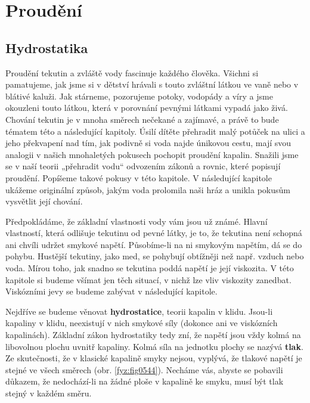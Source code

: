 \setchaptertoc
\chapter{Proudění }\label{fyz:IIchapXL}

  \section{Hydrostatika}\label{fyz:IIchapXLsecI}
    Proudění tekutin a zvláště vody fascinuje každého člověka. Všichni si pamatujeme, jak jsme si v 
    dětství hrávali s touto zvláštní látkou ve vaně nebo v blátivé kaluži. Jak stárneme, pozorujeme 
    potoky, vodopády a víry a jsme okouzleni touto látkou, která v porovnání pevnými látkami vypadá 
    jako živá. Chování tekutin je v mnoha směrech nečekané a zajímavé, a právě to bude tématem této 
    a následující kapitoly. Úsilí dítěte přehradit malý potůček na ulici a jeho překvapení nad tím, 
    jak podivně si voda najde únikovou cestu, mají svou analogii v našich mnohaletých pokusech 
    pochopit proudění kapalin. Snažili jsme se v naší teorii „přehradit vodu“ odvozením zákonů a 
    rovnic, které popisují proudění. Popíšeme takové pokusy v této kapitole. V následující kapitole 
    ukážeme originální způsob, jakým voda prolomila naši hráz a unikla pokusům vysvětlit její 
    chování.
    
    Předpokládáme, že základní vlastnosti vody vám jsou už známé. Hlavní vlastností, která odlišuje 
    tekutinu od pevné látky, je to, že tekutina není schopná ani chvíli udržet smykové napětí. 
    Působíme-li na ni smykovým napětím, dá se do pohybu. Hustější tekutiny, jako med, se pohybují 
    obtížněji než např. vzduch nebo voda. Mírou toho, jak snadno se tekutina poddá napětí je její 
    viskozita. V této kapitole si budeme všímat jen těch situací, v nichž lze vliv viskozity 
    zanedbat. Viskózními jevy se budeme zabývat v následující kapitole.
    
    Nejdříve se budeme věnovat \textbf{hydrostatice}, teorii kapalin v klidu. Jsou-li kapaliny v 
    klidu, neexistují v nich smykové síly (dokonce ani ve viskózních kapalinách). Základní zákon 
    hydrostatiky tedy zní, že napětí jsou vždy kolmá na libovolnou plochu uvnitř kapaliny. Kolmá 
    síla na jednotku plochy se nazývá \textbf{tlak}. Ze skutečnosti, že v klasické kapalině smyky 
    nejsou, vyplývá, že tlakové napětí je stejné ve všech směrech (obr. \ref{fyz:fig0544}). Necháme 
    vás, abyste se pobavili důkazem, že nedochází-li na žádné ploše v kapalině ke smyku, musí být 
    tlak stejný v každém směru.
    
